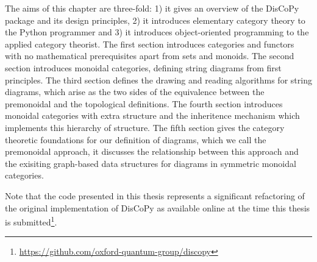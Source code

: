 The aims of this chapter are three-fold: 1) it gives an overview of the DisCoPy package and its design principles, 2) it introduces elementary category theory to the Python programmer and 3) it introduces object-oriented programming to the applied category theorist.
The first section introduces categories and functors with no mathematical prerequisites apart from sets and monoids.
The second section introduces monoidal categories, defining string diagrams from first principles.
The third section defines the drawing and reading algorithms for string diagrams, which arise as the two sides of the equivalence between the premonoidal and the topological definitions.
The fourth section introduces monoidal categories with extra structure and the inheritence mechanism which implements this hierarchy of structure.
The fifth section gives the category theoretic foundations for our definition of diagrams, which we call the premonoidal approach, it discusses the relationship between this approach and the exisiting graph-based data structures for diagrams in symmetric monoidal categories.

Note that the code presented in this thesis represents a significant refactoring of the original implementation of DisCoPy as available online at the time this thesis is submitted\footnote
{\url{https://github.com/oxford-quantum-group/discopy}}.

